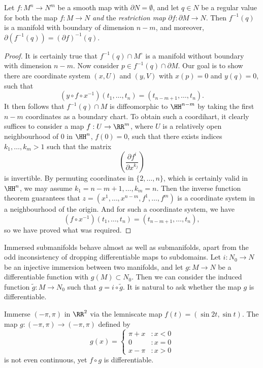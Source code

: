 \begin{theorem}
    Let $f: M^n \to N^m$ be a smooth map with $\partial N = \emptyset$, and let $q \in N$ be a regular value for both the map $f: M \to N$ \emph{and} the \emph{restriction map} $\partial f: \partial M \to N$. Then $f^{-1}(q)$ is a manifold with boundary of dimension $n-m$, and moreover, $\partial(f^{-1}(q)) = (\partial f)^{-1}(q)$.
\end{theorem}
\begin{proof}
    It is certainly true that $f^{-1}(q) \cap M^\circ$ is a manifold without boundary with dimension $n-m$. Now consider $p \in f^{-1}(q) \cap \partial M$. Our goal is to show there are coordinate system $(x,U)$ and $(y,V)$ with $x(p) = 0$ and $y(q) = 0$, such that
    \[ (y \circ f \circ x^{-1})(t_1, \dots, t_n) = (t_{n-m+1}, \dots, t_n). \]
    It then follows that $f^{-1}(q) \cap M$ is diffeomorphic to $\HH^{n-m}$ by taking the first $n-m$ coordinates as a boundary chart. To obtain such a coordihart, it clearly suffices to consider a map $f: U \to \RR^m$, where $U$ is a relatively open neighbourhood of $0$ in $\HH^n$, $f(0) = 0$, such that there exists indices $k_1, \dots, k_m > 1$ such that the matrix
    \[ \left( \frac{\partial f^i}{\partial x^{k_j}} \right) \]
    is invertible. By permuting coordinates in $\{ 2, \dots, n \}$, which is certainly valid in $\HH^n$, we may assume $k_1 = n-m+1, \dots, k_m = n$. Then the inverse function theorem guarantees that $z = (x^1, \dots, x^{n-m}, f^1, \dots, f^m)$ is a coordinate system in a neighbourhood of the origin. And for such a coordinate system, we have
    \[ (f \circ x^{-1})(t_1, \dots, t_n) = (t_{n-m+1}, \dots, t_n), \]
    so we have proved what was required.
\end{proof}

Immersed submanifolds behave almost as well as submanifolds, apart from the odd inconsistency of dropping differentiable maps to subdomains. Let $i: N_0 \to N$ be an injective immersion between two manifolds, and let $g: M \to N$ be a differentiable function with $g(M) \subset N_0$. Then we can consider the induced function $\tilde{g}: M \to N_0$ such that $g = i \circ \tilde{g}$. It is natural to ask whether the map $g$ is differentiable.

\begin{example}
    Immerse $(-\pi, \pi)$ in $\RR^2$ via the lemniscate map $f(t) = (\sin 2t, \sin t)$. The map $g:(-\pi, \pi) \to (-\pi, \pi)$ defined by
    \[ g(x) = \begin{cases} \pi + x &: x < 0 \\ 0 &: x = 0 \\ x - \pi &: x > 0 \end{cases} \]
    is not even continuous, yet $f \circ g$ is differentiable.
\end{example}

